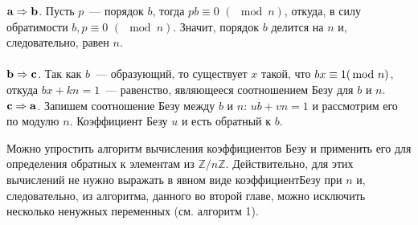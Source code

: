 \documentclass{../../template/mai_book}
\begin{document}
    \begin{myproof}
    ${\bf {a \Rightarrow b}}$. Пусть $p$~— порядок $b$, тогда $pb \equiv 0\,\,(\!\!\!\mod{n})$, откуда, в силу обратимости $b, p \equiv 0\,\,(\!\!\!\mod{n})$.
    Значит, порядок $b$ делится на $n$ и, следовательно, равен $n$.\\\\
    ${\bf {b \Rightarrow c}}$. Так как $b$~— образующий, то существует $x$ такой, что $bx \equiv 1\linebreak(\!\!\!\mod{n})$, откуда $bx + kn = 1$~— равенство, являющееся соотношением Безу для $b$ и $n$.\\

    \noindent${\bf{c \Rightarrow a}}$. Запишем соотношение Безу между $b$ и $n$: $u b + v n = 1$ и рассмотрим его по модулю $n$. Коэффициент Безу $u$ и есть обратный к $b$.
    \end{myproof}
    \newpage
    Можно упростить алгоритм вычисления коэффициентов Безу и применить его для определения обратных к элементам из $\mathbb{Z}/n\mathbb{Z}$. Действительно, для этих вычислений не нужно выражать в явном виде коэффициент\linebreak Безу при $n$ и, следовательно, из алгоритма, данного во второй главе, можно исключить несколько ненужных переменных (см. алгоритм 1).
\end{document}
